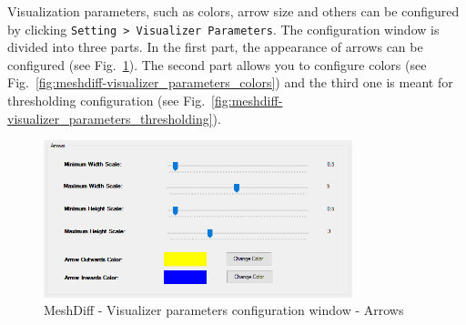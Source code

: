 Visualization parameters, such as colors, arrow size and others can be configured by clicking \verb+Setting > Visualizer Parameters+. The configuration window is divided into three parts. In the first part, the appearance of arrows can be configured (see Fig.~\ref{fig:meshdiff-visualizer_parameters_arrows}). The second part allows you to configure colors (see Fig.~\ref{fig:meshdiff-visualizer_parameters_colors}) and the third one is meant for thresholding configuration (see Fig.~\ref{fig:meshdiff-visualizer_parameters_thresholding}).

\begin{figure}[h]
	\centering
	\includegraphics[width=0.8\textwidth]{./img/meshdiff-visualizer_parameters-arrows.PNG}
	\caption[MeshDiff - Visualizer parameters - Arrows]{MeshDiff - Visualizer parameters configuration window - Arrows}
	\label{fig:meshdiff-visualizer_parameters_arrows}
\end{figure}

